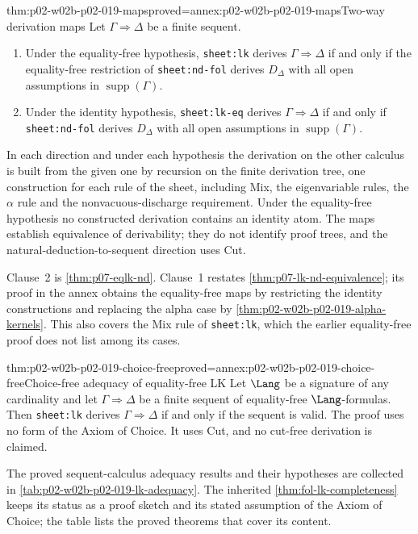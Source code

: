 \begin{hbtheorem}{thm:p02-w02b-p02-019-maps}{proved=annex:p02-w02b-p02-019-maps}{Two-way derivation maps}
Let \(\Gamma\Rightarrow\Delta\) be a finite sequent.
\begin{enumerate}
 \item Under the equality-free hypothesis, \texttt{sheet:lk} derives
   \(\Gamma\Rightarrow\Delta\) if and only if the equality-free restriction
   of \texttt{sheet:nd-fol} derives \(D_{\Delta}\) with all open assumptions
   in \(\operatorname{supp}(\Gamma)\).
 \item Under the identity hypothesis, \texttt{sheet:lk-eq} derives
   \(\Gamma\Rightarrow\Delta\) if and only if \texttt{sheet:nd-fol} derives
   \(D_{\Delta}\) with all open assumptions in
   \(\operatorname{supp}(\Gamma)\).
\end{enumerate}
In each direction and under each hypothesis the derivation on the other
calculus is built from the given one by recursion on the finite derivation
tree, one construction for each rule of the sheet, including Mix, the
eigenvariable rules, the \(\alpha\) rule and the nonvacuous-discharge
requirement.  Under the equality-free hypothesis no constructed derivation
contains an identity atom.  The maps establish equivalence of derivability;
they do not identify proof trees, and the natural-deduction-to-sequent
direction uses Cut.
\end{hbtheorem}

Clause~2 is \cref{thm:p07-eqlk-nd}.  Clause~1 restates
\cref{thm:p07-lk-nd-equivalence}; its proof in the annex obtains the
equality-free maps by restricting the identity constructions and replacing
the alpha case by \cref{thm:p02-w02b-p02-019-alpha-kernels}.  This also
covers the Mix rule of \texttt{sheet:lk}, which the earlier equality-free
proof does not list among its cases.

\begin{hbcorollary}{thm:p02-w02b-p02-019-choice-free}{proved=annex:p02-w02b-p02-019-choice-free}{Choice-free adequacy of equality-free LK}
Let \(\Lang\) be a signature of any cardinality and let
\(\Gamma\Rightarrow\Delta\) be a finite sequent of equality-free
\(\Lang\)-formulas.  Then \texttt{sheet:lk} derives
\(\Gamma\Rightarrow\Delta\) if and only if the sequent is valid.  The proof
uses no form of the Axiom of Choice.  It uses Cut, and no cut-free
derivation is claimed.
\end{hbcorollary}

The proved sequent-calculus adequacy results and their hypotheses are
collected in \cref{tab:p02-w02b-p02-019-lk-adequacy}.  The inherited
\cref{thm:fol-lk-completeness} keeps its status as a proof sketch and its
stated assumption of the Axiom of Choice; the table lists the proved
theorems that cover its content.

